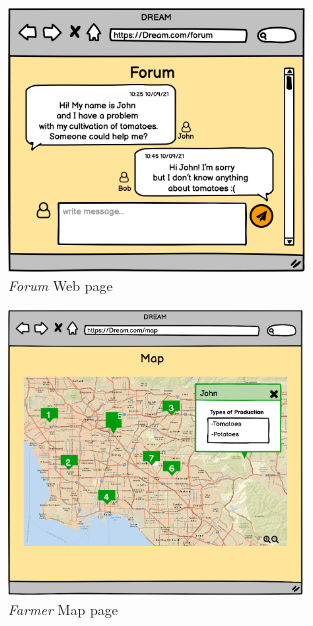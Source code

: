 \begin{figure}[H]
    \begin{center}
    \includegraphics[width=0.7\textwidth]{mocups/Forum.png}
    \caption{\emph{Forum} Web page}
    \label{fig:sequence1}
    \end{center}
\end{figure}

\begin{figure}[H]
    \begin{center}
    \includegraphics[width=0.7\textwidth]{mocups/FMap.png}
    \caption{\emph{Farmer } Map page}
    \label{fig:sequence1}
    \end{center}
\end{figure}

